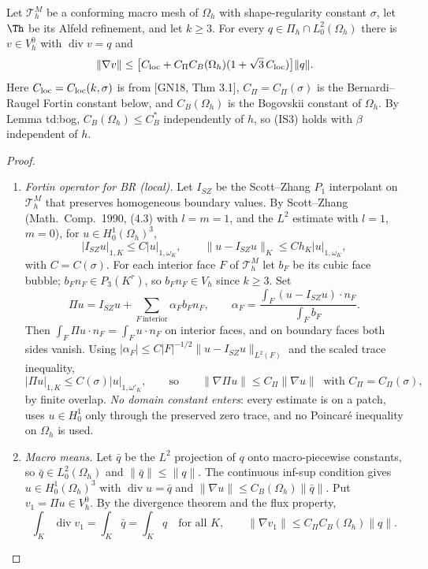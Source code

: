 \documentclass[11pt]{article}
\theoremstyle{remark}\newtheorem{remark}[theorem]{Remark}
\newcommand{\Oh}{\Omega_h}\newcommand{\Gh}{\Gamma_h}\newcommand{\hG}{h_\Gamma}\newcommand{\dn}{\partial_n}
\newcommand{\norm}[1]{\|#1\|}\newcommand{\ip}[2]{\langle #1,#2\rangle}\DeclareMathOperator{\curl}{curl}\DeclareMathOperator{\diam}{diam}
\begin{document}
\begin{lemma}[(IS3) uniformly on $\Oh$]\label{lem:IS3}
Let $\mathcal T_h^M$ be a conforming macro mesh of $\Oh$ with shape-regularity constant $\sigma$, let $\Th$ be its Alfeld refinement, and let $k\ge3$. For every $q\in\Pi_h\cap L^2_0(\Oh)$ there is $v\in V_h^0$ with $\operatorname{div}v=q$ and
\[\norm{\nabla v}\le\bigl[C_{\rm loc}+C_\Pi C_B(\Oh)(1+\sqrt3\,C_{\rm loc})\bigr]\norm q.\]
Here $C_{\rm loc}=C_{\rm loc}(k,\sigma)$ is from [GN18, Thm 3.1], $C_\Pi=C_\Pi(\sigma)$ is the Bernardi--Raugel Fortin constant below, and $C_B(\Oh)$ is the Bogovskii constant of $\Oh$. By Lemma td:bog, $C_B(\Oh)\le C_B^\ast$ independently of $h$, so (IS3) holds with $\beta$ independent of $h$.
\end{lemma}
\begin{proof}
\begin{enumerate}[label=\arabic*.]
\item \emph{Fortin operator for BR (local).} Let $I_{SZ}$ be the Scott--Zhang $P_1$ interpolant on $\mathcal T_h^M$ that preserves homogeneous boundary values. By Scott--Zhang (Math.\ Comp.\ 1990, (4.3) with $l=m=1$, and the $L^2$ estimate with $l=1$, $m=0$), for $u\in H^1_0(\Oh)^3$,
 \[|I_{SZ}u|_{1,K}\le C|u|_{1,\omega_K},\qquad \norm{u-I_{SZ}u}_K\le Ch_K|u|_{1,\omega_K},\]
 with $C=C(\sigma)$. For each interior face $F$ of $\mathcal T^M_h$ let $b_F$ be its cubic face bubble; $b_Fn_F\in P_3(K^r)$, so $b_Fn_F\in V_h$ since $k\ge3$. Set
 \[\Pi u=I_{SZ}u+\sum_{F\ \mathrm{interior}}\alpha_Fb_Fn_F,\qquad \alpha_F=\frac{\int_F(u-I_{SZ}u)\cdot n_F}{\int_Fb_F}.\]
 Then $\int_F\Pi u\cdot n_F=\int_Fu\cdot n_F$ on interior faces, and on boundary faces both sides vanish. Using $|\alpha_F|\le C|F|^{-1/2}\norm{u-I_{SZ}u}_{L^2(F)}$ and the scaled trace inequality,
 \[|\Pi u|_{1,K}\le C(\sigma)|u|_{1,\omega'_K},\qquad\text{so}\qquad \norm{\nabla\Pi u}\le C_\Pi\norm{\nabla u}\ \text{ with }C_\Pi=C_\Pi(\sigma),\]
 by finite overlap. \emph{No domain constant enters}: every estimate is on a patch, uses $u\in H^1_0$ only through the preserved zero trace, and no Poincar\'e inequality on $\Oh$ is used.
\item \emph{Macro means.} Let $\bar q$ be the $L^2$ projection of $q$ onto macro-piecewise constants, so $\bar q\in L^2_0(\Oh)$ and $\norm{\bar q}\le\norm q$. The continuous inf-sup condition gives $u\in H^1_0(\Oh)^3$ with $\operatorname{div}u=\bar q$ and $\norm{\nabla u}\le C_B(\Oh)\norm{\bar q}$. Put $v_1=\Pi u\in V_h^0$. By the divergence theorem and the flux property,
 \[\int_K\operatorname{div}v_1=\int_K\bar q=\int_Kq\quad\text{for all }K,\qquad \norm{\nabla v_1}\le C_\Pi C_B(\Oh)\norm q.\]

\end{enumerate}
\end{proof}
\end{document}

